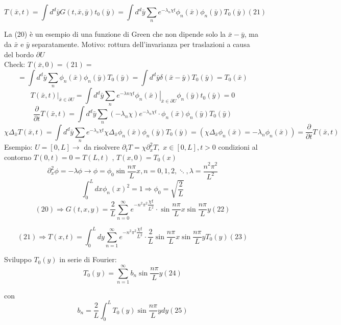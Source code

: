 \documentclass[a4paper,11pt]{report}
\begin{document}
\begin{equation}
T(\bar{x},t)=\int d^d\bar{y}G(t,\bar{x},\bar{y})t_0(\bar{y})=\int d^d \bar{y}\sum_{n}e^{-\lambda_n\chi t}\phi_n(\bar{x})\phi_n(\bar{y})T_0(\bar{y})(21)
\end{equation}


La (20) è un esempio di una funzione di Green che non dipende solo la $\bar{x}-\bar{y}$, ma da $\bar{x}$ e $\bar{y}$ separatamente. Motivo: rottura dell'invarianza per traslazioni a causa del bordo $\partial U$\\
Check: $T(\bar{x},0)=(21)=$
$$
=\int d^d \bar{y}\sum_{n}\phi_n(\bar{x})\phi_n(\bar{y})T_0(\bar{y})=\int d^d\bar{y}\delta(\bar{x}-\bar{y})T_0(\bar{y})=T_0(\bar{x})
$$
$$
\left . T(\bar{x},t)\right|_{\bar{x}\in\partial U}=\int d^d\bar{y}\sum_n e^{-\lambda n \chi t}
\left . \phi_n(\bar{x})\right|_{\bar{x}\in\partial U}\phi_n(\bar{y})t_0(\bar{y})=0
$$
$$
\dfrac{\partial}{\partial t}T(\bar{x},t)=\int d^d\bar{y}\sum_n (-\lambda_n \chi)e^{-\lambda_n\chi t}\cdot \phi_n(\bar{x})\phi_n(\bar{y})T_0(\bar{y})
$$
$$
\chi\Delta_{\bar{x}}T(\bar{x},t)=\int d^d \bar{y} \sum_n e^{-\lambda_n \chi t}\chi\Delta_{\bar{x}}\phi_n(\bar{x})\phi_n(\bar{y})T_0(\bar{y})=(\chi\Delta_{\bar{x}}\phi_n(\bar{x})=-\lambda_n\phi_n(\bar{x}))=\dfrac{\partial}{\partial t}T(\bar{x},t)
$$
Esempio: $U=[0,L] \rightarrow$ da risolvere $\partial_t T=\chi\partial_{x}^2T, $ $x\in[0,L],t>0$
condizioni al contorno $T(0,t)=0=T(L,t)$ , $T(x,0)=T_0(x)$
$$
\partial^{2}_{x}\phi=-\lambda\phi\rightarrow\phi=\phi_0\sin\dfrac{n\pi}{L}x, n=0,1,2,\ddots, \lambda=\dfrac{n^2\pi^2}{L^2}
$$
$$
\int_0^L dx \phi_n(x)^2=1\Rightarrow\phi_0=\sqrt{\dfrac{2}{L}}
$$
\begin{equation}
(20)\Rightarrow G(t,x,y)=\dfrac{2}{L}\sum_{n=0}^{\infty}e^{-n^2\pi^2\dfrac{\chi t}{L^2}}\cdot \sin\dfrac{n\pi}{L}x\sin\dfrac{n\pi}{L}y (22)
\end{equation}

\begin{equation}
(21)\Rightarrow T(x,t)=\int_0^L dy\sum_{n=1}^{\infty}e^{-n^2\pi^2\dfrac{\chi t}{L^2}}\cdot \dfrac{2}{L}\sin\dfrac{n\pi}{L}x\sin\dfrac{n\pi}{L}y T_0(y) (23)
\end{equation}

Sviluppo $T_0(y)$ in serie di Fourier: 
\begin{equation}
T_0(y)=\sum_{n=1}^{\infty}b_n\sin\dfrac{n\pi}{L}y (24)
\end{equation}

con 
\begin{equation}
b_n=\dfrac{2}{L}\int_0^LT_0(y)\sin\dfrac{n\pi}{L}ydy (25)
\end{equation}
\end{document}
